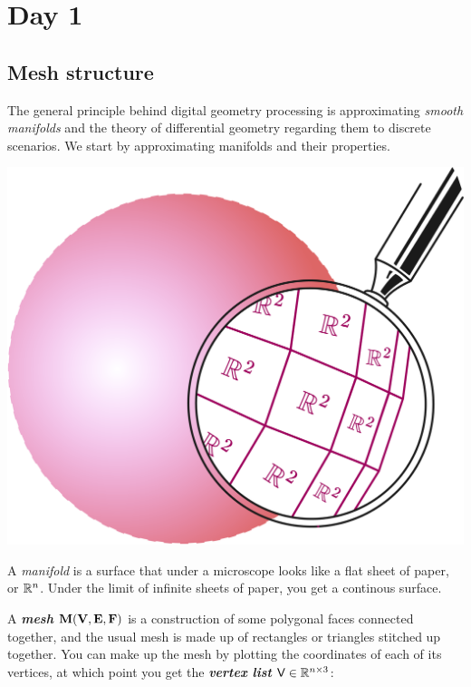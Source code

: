 \chapter{Day 1}

\section{Mesh structure}

The general principle behind digital geometry processing is
approximating \emph{smooth manifolds} and the theory of
differential geometry regarding them to discrete scenarios.
We start by approximating manifolds and their properties.

\begin{marginfigure}
    \centering
    \includegraphics[width=0.8\linewidth]{images/sphere1.png}
    \caption{ A \textit{manifold} is a surface that under a microscope looks like
a flat sheet of paper, or $\RR^n$. Under the limit of 
infinite sheets of paper, you get a continous surface.}
\end{marginfigure}

\spa

A \textbf{\emph{mesh}} $\bf{M(V,E,F)}$ is a construction of some polygonal faces 
connected together, and the usual mesh is made up of rectangles or triangles 
stitched up together. You can make up the mesh by plotting the coordinates
of each of its vertices, at which point you get the
\emph{\textbf{vertex list}} $\Vsf \in  \RR^{n \times 3}$:

